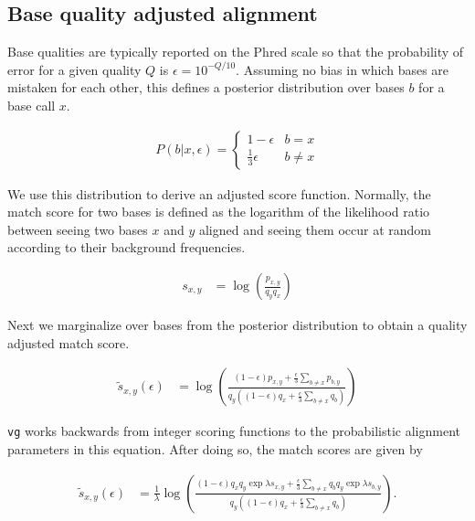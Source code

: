 \subsection{Base quality adjusted alignment}

Base qualities are typically reported on the Phred scale so that the probability of error for a given quality $Q$ is $\epsilon = 10^{-Q/10}$. Assuming no bias in which bases are mistaken for each other, this defines a posterior distribution over bases $b$ for a base call $x$.

\begin{align}
    P(b|x, \epsilon) = \begin{cases}
        1 - \epsilon & b = x \\
        \frac{1}{3} \epsilon & b \neq x
    \end{cases}
\end{align}

We use this distribution to derive an adjusted score function. Normally, the match score for two bases is defined as the logarithm of the likelihood ratio between seeing two bases $x$ and $y$ aligned and seeing them occur at random according to their background frequencies. 

\begin{align}
    s_{x,y} &= \log\left(\frac{p_{x,y}}{q_y q_x} \right) \label{eqn:base_score}
\end{align}

Next we marginalize over bases from the posterior distribution to obtain a quality adjusted match score.

\begin{align}
    \tilde s_{x,y}(\epsilon) &= \log\left(\frac{(1 - \epsilon)p_{x,y} + \frac{\epsilon}{3}\sum_{b \neq x}p_{b, y}}{q_y\left((1 - \epsilon)q_x + \frac{\epsilon}{3}\sum_{b \neq x}q_b \right)} \right)
\end{align}

{\tt vg} works backwards from integer scoring functions to the probabilistic alignment parameters in this equation. After doing so, the match scores are given by

\begin{align}
    \tilde s_{x,y}(\epsilon) &= \frac{1}{\lambda} \log\left(\frac{(1 - \epsilon)q_x q_y \exp \lambda s_{x,y} + \frac{\epsilon}{3}\sum_{b \neq x}q_b q_y \exp \lambda s_{b,y}}{q_y\left((1 - \epsilon)q_x + \frac{\epsilon}{3}\sum_{b \neq x}q_b \right)} \right).
\end{align}

